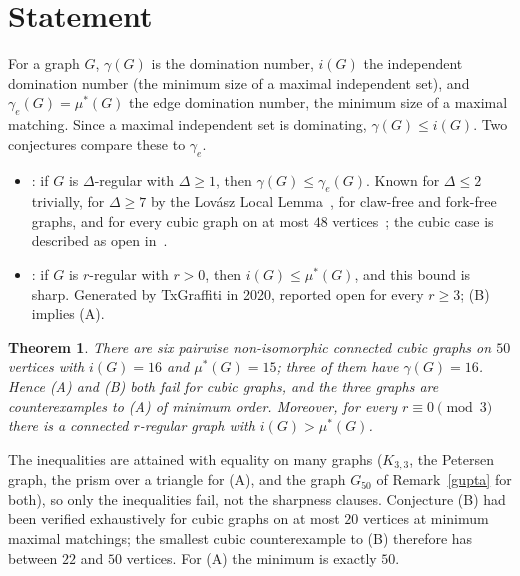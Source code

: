 \documentclass[11pt]{article}
\newtheorem{theorem}{Theorem}\newtheorem{lemma}[theorem]{Lemma}\newtheorem{proposition}[theorem]{Proposition}
\theoremstyle{remark}\newtheorem{remark}[theorem]{Remark}
\begin{document}
\section{Statement}
For a graph $G$, $\gamma(G)$ is the domination number, $i(G)$ the independent domination number (the minimum size of a maximal independent set), and $\gamma_e(G)=\mu^*(G)$ the edge domination number, the minimum size of a maximal matching. Since a maximal independent set is dominating, $\gamma(G)\le i(G)$. Two conjectures compare these to $\gamma_e$.
\begin{itemize}
\item[(A)] \cite{BFHMR}: if $G$ is $\Delta$-regular with $\Delta\ge1$, then $\gamma(G)\le\gamma_e(G)$. Known for $\Delta\le2$ trivially, for $\Delta\ge7$ by the Lov\'asz Local Lemma~\cite{Gupta}, for claw-free and fork-free graphs, and for every cubic graph on at most $48$ vertices~\cite[Prop.~7]{Gupta}; the cubic case is described as open in~\cite{Gupta}.
\item[(B)] \cite[Conj.~3]{DBP}: if $G$ is $r$-regular with $r>0$, then $i(G)\le\mu^*(G)$, and this bound is sharp. Generated by TxGraffiti in 2020, reported open for every $r\ge3$; (B) implies (A).
\end{itemize}
\begin{theorem}\label{main}
There are six pairwise non-isomorphic connected cubic graphs on $50$ vertices with $i(G)=16$ and $\mu^*(G)=15$; three of them have $\gamma(G)=16$. Hence (A) and (B) both fail for cubic graphs, and the three graphs are counterexamples to (A) of minimum order. Moreover, for every $r\equiv0\pmod3$ there is a connected $r$-regular graph with $i(G)>\mu^*(G)$.
\end{theorem}
The inequalities are attained with equality on many graphs ($K_{3,3}$, the Petersen graph, the prism over a triangle for (A), and the graph $G_{50}$ of Remark~\ref{gupta} for both), so only the inequalities fail, not the sharpness clauses. Conjecture (B) had been verified exhaustively for cubic graphs on at most $20$ vertices at minimum maximal matchings; the smallest cubic counterexample to (B) therefore has between $22$ and $50$ vertices. For (A) the minimum is exactly $50$.
\end{document}
